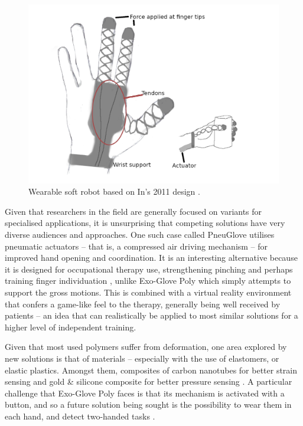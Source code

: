 \begin{figure}
    \centering
    \includegraphics[width=0.8\columnwidth]{files/Gloves.png}
    \caption{Wearable soft robot based on In's 2011 design \citep{InHyunki2011Jsau}. }
    \label{fig:Wearable_Glove}
\end{figure}

Given that researchers in the field are generally focused on variants for specialised applications, it is unsurprising that competing solutions have very diverse audiences and approaches.
One such case called PneuGlove utilises pneumatic actuators -- that is, a compressed air driving mechanism -- for improved hand opening and coordination.
It is an interesting alternative because it is designed for occupational therapy use, strengthening pinching and perhaps training finger individuation \citep{CianchettiMatteo2018Baos,ConnellyLauri2010APGa}, unlike Exo-Glove Poly which simply attempts to support the gross motions.
This is combined with a virtual reality environment that confers a game-like feel to the therapy, generally being well received by patients \citep{ConnellyLauri2010APGa} -- an idea that can realistically be applied to most similar solutions for a higher level of independent training.

Given that most used polymers suffer from deformation, one area explored by new solutions is that of materials -- especially with the use of elastomers, or elastic plastics. 
Amongst them, composites of carbon nanotubes for better strain sensing and gold \& silicone composite for better pressure sensing \citep{YeoJooChuan2016SRFS}.
A particular challenge that Exo-Glove Poly faces is that its mechanism is activated with a button, and so a future solution being sought is the possibility to wear them in each hand, and detect two-handed tasks \citep{SNUBioRobotics2016}.

